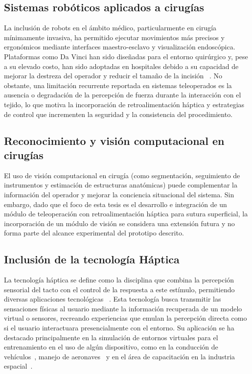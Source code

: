 \subsection{Sistemas robóticos aplicados a cirugías}
La inclusión de robots en el ámbito médico, particularmente en cirugía
mínimamente invasiva, ha permitido ejecutar movimientos más precisos y
ergonómicos mediante interfaces maestro-esclavo y visualización endoscópica.
Plataformas como Da Vinci han sido diseñadas para el entorno quirúrgico y, pese
a su elevado costo, han sido adoptadas en hospitales debido a su capacidad de
mejorar la destreza del operador y reducir el tamaño de la incisión
~\cite{review_of_haptic_feedback}. No obstante, una limitación recurrente
reportada en sistemas teleoperados es la ausencia o degradación de la
percepción de fuerza durante la interacción con el tejido, lo que motiva la
incorporación de retroalimentación háptica y estrategias de control que
incrementen la seguridad y la consistencia del procedimiento.

\subsection{Reconocimiento y visión computacional en cirugías}
El uso de visión computacional en cirugía (como segmentación, 
seguimiento de instrumentos y estimación de estructuras anatómicas) puede
complementar la información del operador y mejorar la conciencia situacional
del sistema. Sin embargo, dado que el foco de esta tesis es el desarrollo e
integración de un módulo de teleoperación con retroalimentación háptica para
sutura superficial, la incorporación de un módulo de visión se considera una
extensión futura y no forma parte del alcance experimental del prototipo
descrito.

\subsection{Inclusión de la tecnología Háptica}

La tecnología háptica se define como la disciplina que combina la percepción
sensorial del tacto con el control de la respuesta a este estímulo, permitiendo
diversas aplicaciones tecnológicas
~\cite{Informacion_de_aplicaciones_tecnologia_haptica}. Esta tecnología busca
transmitir las sensaciones físicas al usuario mediante la información
recuperada de un modelo virtual o sensores, recreando experiencias que emulan
la percepción directa como si el usuario interactuara presencialmente con el
entorno. Su aplicación se ha destacado principalmente en la simulación de
entornos virtuales para el entrenamiento en el uso de algún dispositivo, como
en la conducción de vehículos~\cite{Ejemplo_haptic_manejo_carro}, manejo de
aeronaves~\cite{Ejemplo_haptic_piloto_avion} y en el área de capacitación en la
industria espacial~\cite{Ejemplo_haptic_entrenamiento_espacial}.

